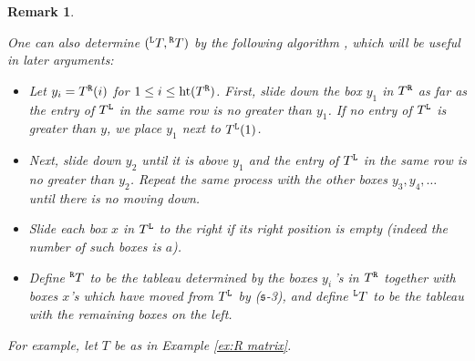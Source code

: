 \documentclass[leqno,11pt]{amsart}
\newtheorem{rem}[thm]{\bf Remark}
\numberwithin{equation}{section}
\newcommand{\mf}{\mathfrak}
\begin{document}
\begin{rem}\label{rem:equivalent algorithm}
{\rm
One can also determine 
$({}^{\tt L}T, {}^{\tt R}T)$ by the following algorithm \cite[(3.6)]{K16}, which will be useful in later arguments:%
\begin{itemize}
\item[($\mf s$-1)] Let $y_i=T^{\tt R}(i)$ for $1\leq i\leq {\rm ht}(T^{\tt R})$. First, slide down the box $\boxed{y_1}$ in $T^{\tt R}$ as far as the entry of $T^{\tt L}$ in the same row is no greater than $y_1$. If  no entry of $T^{\tt L}$ is greater than $y$, we place $\boxed{y_1}$ next to $T^{\tt L}(1)$.

\item[($\mf s$-2)] Next, slide down $\boxed{y_2}$ until it is above $\boxed{y_1}$ and the entry of $T^{\tt L}$ in the same row is no greater than $y_2$. Repeat the same process with the other boxes $\boxed{y_3}, \boxed{y_4},\ldots$  until there is no moving down.

\item[($\mf s$-3)] Slide each box $\boxed{x}$ in $T^{\tt L}$ to the right if its right position is empty  (indeed the number of such boxes is $a$).

\item[($\mf s$-4)] Define ${}^{\tt R}T$ to be the tableau determined by the boxes $\boxed{y_i}$\,'s in $T^{\tt R}$ together with boxes $\boxed{x}$'s which have moved from $T^{\tt L}$ by ($\mf s$-3), and define ${}^{\tt L}T$ to be the tableau with the remaining boxes on the left.
\end{itemize}
For example, let $T$ be as in Example \ref{ex:R matrix}.
 
}
\end{rem}
\end{document}
